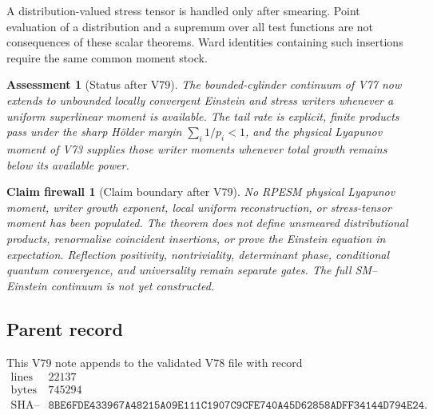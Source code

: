 \documentclass[11pt]{article}
\newtheorem{firewall}[theorem]{Claim firewall}
\newtheorem{assessment}[theorem]{Assessment}
\theoremstyle{remark}
\begin{document}
A distribution-valued stress tensor is handled only after smearing.
Point evaluation of a distribution and a supremum over all test
functions are not consequences of these scalar theorems.  Ward
identities containing such insertions require the same common moment
stock.

\begin{assessment}[Status after V79]
\label{ass:v12v79-status}
The bounded-cylinder continuum of V77 now extends to unbounded
locally convergent Einstein and stress writers whenever a uniform
superlinear moment is available.  The tail rate is explicit, finite
products pass under the sharp Hölder margin
\(\sum_i1/p_i<1\), and the physical Lyapunov moment of V73 supplies
those writer moments whenever total growth remains below its
available power.
\end{assessment}

\begin{firewall}[Claim boundary after V79]
\label{fire:v12v79-claim}
No RPESM physical Lyapunov moment, writer growth exponent, local
uniform reconstruction, or stress-tensor moment has been populated.
The theorem does not define unsmeared distributional products,
renormalise coincident insertions, or prove the Einstein equation in
expectation.  Reflection positivity, nontriviality, determinant
phase, conditional quantum convergence, and universality remain
separate gates.  The full SM--Einstein continuum is not yet
constructed.
\end{firewall}

\subsection{Parent record}

This V79 note appends to the validated V78 file with record
\[
\begin{array}{c|c}
\text{lines}&22137\\
\text{bytes}&745294\\
\text{SHA--256}&
\texttt{8BE6FDE433967A48215A09E111C1907C9CFE740A45D62858ADFF34144D794E24}.
\end{array}
\]




\end{document}

